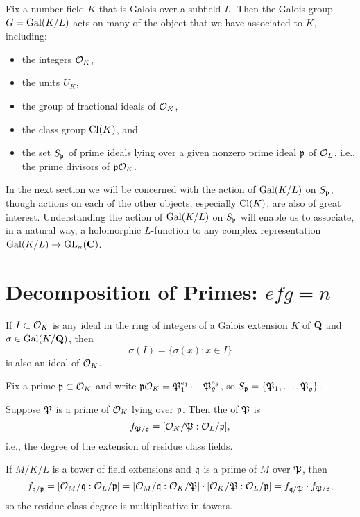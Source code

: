 Fix a number field $K$ that is Galois over a subfield
$L$. Then the Galois group $G=\Gal(K/L)$ acts on many
of the object that we have associated to $K$, including:
\begin{itemize}
\item the integers $\O_K$,
\item the units $U_K$,
\item the group of  fractional ideals of $\O_K$,
\item the class group $\Cl(K)$, and
\item the set $S_\p$ of prime ideals lying over a given nonzero
prime ideal $\p$ of $\O_L$, i.e., the prime divisors of $\p\O_K$.
\end{itemize}
In the next section we will be concerned with the action of
$\Gal(K/L)$ on $S_\p$, though actions on each of the other objects,
especially $\Cl(K)$, are also of great interest.  Understanding the
action of $\Gal(K/L)$ on $S_{\p}$ will enable us to associate, in a
natural way, a holomorphic $L$-function to any complex representation
$\Gal(K/L) \to \GL_n(\C)$.

\section{Decomposition of Primes: $efg=n$}
If $I\subset \O_K$ is any ideal in the ring of integers of
a Galois extension $K$ of $\Q$ and $\sigma\in\Gal(K/\Q)$, then
$$
  \sigma(I) = \{\sigma(x) : x \in I\}
$$
is also an ideal of $\O_K$.


Fix a prime $\p\subset \O_K$ and write $\p\O_K = \P_1^{e_1}\cdots 
\P_g^{e_g}$, so $S_\p=\{\P_1,\ldots, \P_g\}$.
\begin{definition}
Suppose $\P$ is a prime of $\O_K$ lying over $\p$. 
Then the  of $\P$ is 
$$
   f_{\P/\p} = [\O_K/\P : \O_L/\p],$$
i.e., the degree of the extension of residue class fields.
\end{definition}
If $M/K/L$ is a tower of field extensions and
$\q$ is a prime of $M$ over $\P$, then 
$$f_{\q/\p} = [\O_M/\q : \O_L/\p]
=[\O_M/\q : \O_K/\P]\cdot [\O_K/\P : \O_L/\p] = 
f_{\q/\P}\cdot f_{\P/\p},$$
so the residue class degree is multiplicative in
towers. 

